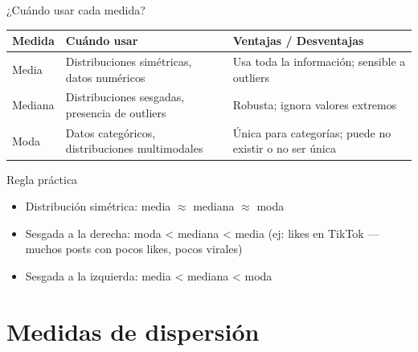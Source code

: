 \documentclass[aspectratio=169, 11pt]{beamer}
\begin{document}
\begin{frame}{¿Cuándo usar cada medida?}
\begin{table}
\centering
\small
\begin{tabular}{lp{6cm}p{5cm}}
\toprule
\textbf{Medida} & \textbf{Cuándo usar} & \textbf{Ventajas / Desventajas} \\
\midrule
Media & Distribuciones simétricas, datos numéricos & Usa toda la información; sensible a outliers \\
\addlinespace
Mediana & Distribuciones sesgadas, presencia de outliers & Robusta; ignora valores extremos \\
\addlinespace
Moda & Datos categóricos, distribuciones multimodales & Única para categorías; puede no existir o no ser única \\
\bottomrule
\end{tabular}
\end{table}

\vspace{0.3em}
\begin{alertblock}{Regla pr\'actica}
\begin{itemize}
\item Distribuci\'on sim\'etrica: media $\approx$ mediana $\approx$ moda
\item Sesgada a la derecha: moda < mediana < media (ej: likes en TikTok --- muchos posts con pocos likes, pocos virales)
\item Sesgada a la izquierda: media < mediana < moda
\end{itemize}
\end{alertblock}
\end{frame}

\section{Medidas de dispersión}
\end{document}
